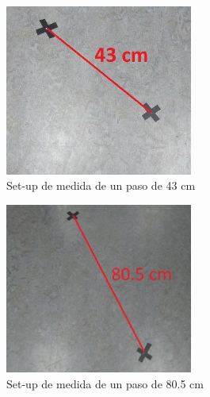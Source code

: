 \begin{figure}[H]
	\centering
	\includegraphics[width=0.55\textwidth]{./graphics/setup_43}
	\caption{Set-up de medida de un paso de 43 cm} \label{fig:setup_43}
\end{figure}

\begin{figure}[H]
		\centering
		\includegraphics[width=0.55\textwidth]{./graphics/setup_80}
		\caption{Set-up de medida de un paso de 80.5 cm} \label{fig:setup_80}
\end{figure}
	
